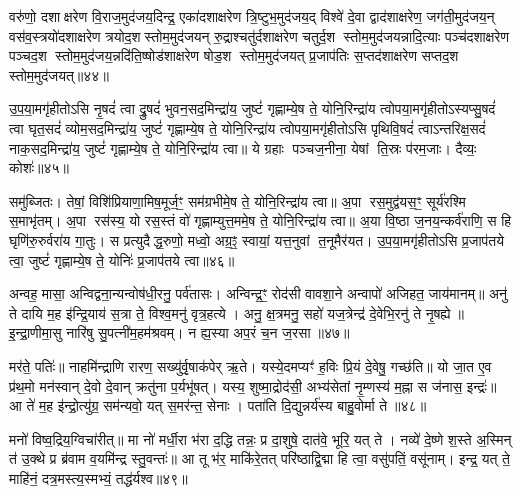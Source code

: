 वरु॑णो॒ दशाक्षरेण वि॒राज॒मुद॑जय॒दिन्द्र॒ एका॑दशाक्षरेण त्रि॒ष्टुभ॒मुद॑जय॒द् विश्वे॑ दे॒वा द्वाद॑शाक्षरेण॒ जग॑ती॒मुद॑जय॒न् वस॑व॒स्त्रयो॑दशाक्षरेण त्रयोद॒शस्तोम॒मुद॑जयन् रु॒द्राश्चतु॑र्दशाक्षरेण चतुर्द॒श स्तोम॒मुद॑जयन्नादि॒त्याः पञ्च॑दशाक्षरेण पञ्चद॒श स्तोम॒मुद॑जय॒न्नदि॑ति॒ष्षोड॑शाक्षरेण षोड॒श स्तोम॒मुद॑जयत् प्र॒जाप॑तिः स॒प्तद॑शाक्षरेण सप्तद॒श स्तोम॒मुद॑जयत्॥४४॥

{\anuvakamend[{अ॒ज॒य॒त् षट्च॑त्वारिशच्च॥11॥}]}

उ॒प॒या॒मगृ॑हीतोऽसि नृ॒षदं॑ त्वा द्रु॒षदं॑ भुवन॒सद॒मिन्द्रा॑य॒ जुष्टं॑ गृह्णाम्ये॒ष ते॒ योनि॒रिन्द्रा॑य त्वोपया॒मगृ॑हीतोऽस्यप्सु॒षदं॑ त्वा घृत॒सदं॑ व्योम॒सद॒मिन्द्रा॑य॒ जुष्टं॑ गृह्णाम्ये॒ष ते॒ योनि॒रिन्द्रा॑य त्वोपया॒मगृ॑हीतोऽसि पृथिवि॒षदं॑ त्वाऽन्तरिक्ष॒सदं॑ नाक॒सद॒मिन्द्रा॑य॒ जुष्टं॑ गृह्णाम्ये॒ष ते॒ योनि॒रिन्द्रा॑य त्वा॥ ये ग्रहाः पञ्चज॒नीना॒ येषां ति॒स्रः प॑रम॒जाः। दैव्यः॒ कोशः॑॥४५॥

समु॑ब्जितः। तेषां॒ विशि॑प्रियाणा॒मिष॒मूर्ज॒ꣳ॒ सम॑ग्रभीमे॒ष ते॒ योनि॒रिन्द्रा॑य त्वा॥ अ॒पा रस॒मुद्व॑यस॒ꣳ॒ सूर्य॑रश्मि स॒माभृ॑तम्। अ॒पा रस॑स्य॒ यो रस॒स्तं वो॑ गृह्णाम्युत्त॒ममे॒ष ते॒ योनि॒रिन्द्रा॑य त्वा॥ अ॒या वि॒ष्ठा ज॒नय॒न्कर्व॑राणि॒ स हि घृणि॑रु॒रुर्वरा॑य गा॒तुः। स प्रत्युदैद्ध॒रुणो॒ मध्वो॒ अग्र॒ꣵ॒ स्वायां॒ यत्त॒नुवां त॒नूमैर॑यत। उ॒प॒या॒मगृ॑हीतोऽसि प्र॒जाप॑तये त्वा॒ जुष्टं॑ गृह्णाम्ये॒ष ते॒ योनिः॑ प्र॒जाप॑तये त्वा॥४६॥

{\anuvakamend[{कोश॑स्त॒नुवां॒ त्रयो॑दश च॥12॥}]}

अन्वह॒ मासा॒ अन्विद्वना॒न्यन्वोष॑धी॒रनु॒ पर्व॑तासः। अन्विन्द्र॒ꣳ॒ रोद॑सी वावशा॒ने अन्वापो॑ अजिहत॒ जाय॑मानम्॥ अनु॑ ते दायि म॒ह इ॑न्द्रि॒याय॑ स॒त्रा ते॒ विश्व॒मनु॑ वृत्र॒हत्ये। अनु॒ क्ष॒त्रमनु॒ सहो॑ यज॒त्रेन्द्र॑ दे॒वेभि॒रनु॑ ते नृ॒षह्ये॥ इ॒न्द्रा॒णीमा॒सु नारि॑षु सु॒पत्नी॑म॒हम॑श्रवम्। न ह्य॒स्या अप॒रं च॒न ज॒रसा॥४७॥

मर॑ते॒ पतिः॑॥ नाहमि॑न्द्राणि रारण॒ सख्यु॑र्वृ॒षाक॑पेर् ऋ॒ते। यस्ये॒दमप्यꣳ॑ ह॒विः प्रि॒यं दे॒वेषु॒ गच्छ॑ति॥ यो जा॒त ए॒व प्र॑थ॒मो मन॑स्वान् दे॒वो दे॒वान् क्रतु॑ना प॒र्यभू॑षत्। यस्य॒ शुष्मा॒द्रोद॑सी॒ अभ्य॑सेतां नृ॒म्णस्य॑ म॒ह्ना स ज॑नास॒ इन्द्रः॑॥ आ ते॑ म॒ह इ॑न्द्रो॒त्यु॑ग्र॒ सम॑न्यवो॒ यत् स॒मर॑न्त॒ सेनाः। पता॑ति दि॒द्युन्नर्य॑स्य बाहु॒वोर्मा ते॥४८॥

मनो॑ विष्व॒द्रिय॒ग्विचा॑रीत्॥ मा नो॑ मर्धी॒रा भ॑रा द॒द्धि तन्नः॒ प्र दा॒शुषे॒ दात॑वे॒ भूरि॒ यत् ते। नव्ये॑ दे॒ष्णे श॒स्ते अ॒स्मिन् त॑ उ॒क्थे प्र ब्र॑वाम व॒यमि॑न्द्र स्तु॒वन्तः॑॥ आ तू भ॑र॒ माकि॑रे॒तत् परि॑ष्ठाद्वि॒द्मा हि त्वा॒ वसु॑पतिं॒ वसू॑नाम्। इन्द्र॒ यत् ते॒ माहि॑नं॒ दत्र॒मस्त्य॒स्मभ्यं॒ तद्ध॑र्यश्व॥४९॥

